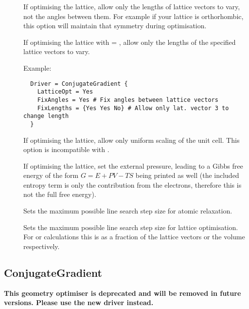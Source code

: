 \begin{description}
\item[] If optimising the lattice, allow only the
  lengths of lattice vectors to vary, not the angles between them. For
  example if your lattice is orthorhombic, this option will maintain
  that symmetry during optimisation.

\item[] If optimising the lattice with  =
  , allow only the lengths of the specified lattice vectors to
  vary.

  Example:
  \invparskip
\begin{verbatim}
  Driver = ConjugateGradient {
    LatticeOpt = Yes
    FixAngles = Yes # Fix angles between lattice vectors
    FixLengths = {Yes Yes No} # Allow only lat. vector 3 to change length
  }
\end{verbatim}

\item[] If optimising the lattice, allow only uniform
  scaling of the unit cell. This option is incompatible with
  .

\item[] If optimising the lattice, set
  the external pressure, leading to a Gibbs free energy of the form $G = E + PV
  - TS$ being printed as well (the included entropy term is only the
  contribution from the electrons, therefore this is not the full free energy).

\item[] Sets the maximum possible line search step size
  for atomic relaxation.

\item[] Sets the maximum possible line search step
  size for lattice optimisation. For  or 
  calculations this is as a fraction of the lattice vectors or the
  volume respectively.

\end{description}


\subsection{ConjugateGradient\cb}
\label{sec:dftbp.ConjugateGradient}

\textbf{This geometry optimiser is deprecated and will be removed in future versions.
Please use the new  driver instead.}

